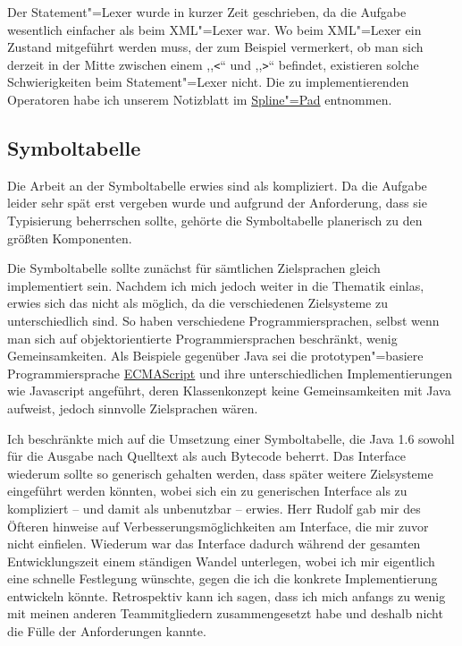 \documentclass[10pt,a4paper,ngerman,titlepage,tocindentauto]{scrartcl}
\begin{document}
			Der Statement"=Lexer wurde in kurzer Zeit geschrieben, da die Aufgabe wesentlich einfacher als beim
			XML"=Lexer war. Wo beim XML"=Lexer ein Zustand mitgeführt werden muss, der zum Beispiel vermerkert, ob
			man sich derzeit in der Mitte zwischen einem ,,\verb|<|`` und ,,\verb|>|`` befindet, existieren solche Schwierigkeiten
			beim Statement"=Lexer nicht. Die zu implementierenden Operatoren habe ich unserem Notizblatt im
			\href{http://pad.spline.de/ep/pad/view/ro.v9mc/rev.9252}{Spline"=Pad} entnommen.
		
		\subsection{Symboltabelle}
			Die Arbeit an der Symboltabelle erwies sind als kompliziert. Da die Aufgabe leider sehr spät erst
			vergeben wurde und aufgrund der Anforderung, dass sie Typisierung beherrschen sollte, gehörte
			die Symboltabelle planerisch zu den größten Komponenten.
			
			Die Symboltabelle sollte zunächst für sämtlichen Zielsprachen gleich implementiert sein. Nachdem
			ich mich jedoch weiter in die Thematik einlas, erwies sich das nicht als möglich, da die verschiedenen
			Zielsysteme zu unterschiedlich sind. So haben verschiedene Programmiersprachen, selbst wenn man
			sich auf objektorientierte Programmiersprachen beschränkt, wenig Gemeinsamkeiten. Als Beispiele gegenüber
			Java sei die prototypen"=basiere
			Programmiersprache \href{http://www.ecma-international.org/publications/standards/Ecma-262.htm}{ECMAScript}
			und ihre unterschiedlichen Implementierungen wie Javascript
			angeführt, deren Klassenkonzept keine Gemeinsamkeiten mit Java aufweist, jedoch sinnvolle Zielsprachen
			wären.
			
			Ich beschränkte mich auf die Umsetzung einer Symboltabelle, die Java 1.6 sowohl für die Ausgabe
			nach Quelltext als auch Bytecode beherrt. Das Interface wiederum sollte so generisch gehalten werden,
			dass später weitere Zielsysteme eingeführt werden könnten, wobei sich ein zu generischen Interface
			als zu kompliziert -- und damit als unbenutzbar -- erwies. Herr Rudolf gab mir des Öfteren hinweise
			auf Verbesserungsmöglichkeiten am Interface, die mir zuvor nicht einfielen. Wiederum war das Interface
			dadurch während der gesamten Entwicklungszeit einem ständigen Wandel unterlegen, wobei ich mir eigentlich
			eine schnelle Festlegung wünschte, gegen die ich die konkrete Implementierung entwickeln könnte.
			Retrospektiv kann ich sagen, dass ich mich anfangs zu wenig mit meinen anderen Teammitgliedern
			zusammengesetzt habe und deshalb nicht die Fülle der Anforderungen kannte.
			
\end{document}
